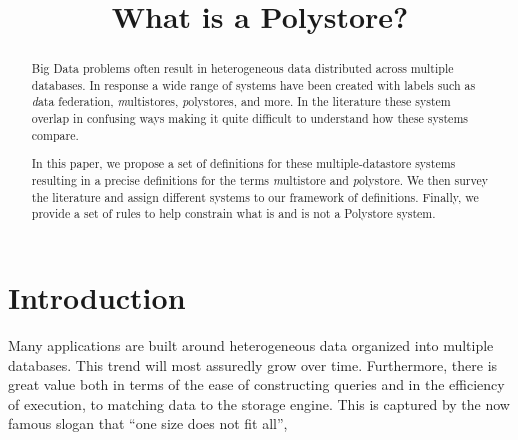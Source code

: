 \documentclass[conference]{IEEEtran}
\begin{document}
%
%
\title{What is a Polystore?}
%
%
\author{
}

\maketitle

\let\thefootnote\relax{}

\begin{abstract}

Big Data problems often result in heterogeneous
data distributed across multiple databases.  
In response a wide range of systems have been created
with labels such as
{\emph data federation}, 
{\emph multistores}, {\emph polystores}, and more.  In 
the literature these system overlap in confusing ways making it quite 
difficult to understand how these systems compare.

In this paper, we propose a set of definitions for these
multiple-datastore systems resulting in a precise definitions
for the terms {\emph multistore} and {\emph polystore}.  
We then survey the literature and assign 
different systems to our framework of definitions.
Finally, we provide a set of rules to help constrain what is and
is not a Polystore system.

\end{abstract}


\IEEEpeerreviewmaketitle

\section{Introduction}

Many applications are built around heterogeneous 
data organized into multiple databases.  This trend will most
assuredly grow over time.   Furthermore, there is great value
both in terms of the ease of constructing queries and in the 
efficiency of execution, to matching data to the 
storage engine.  This is captured by the now famous
slogan that ``one size does not fit all'',~\cite{Stonebraker2005one}
\end{document}
